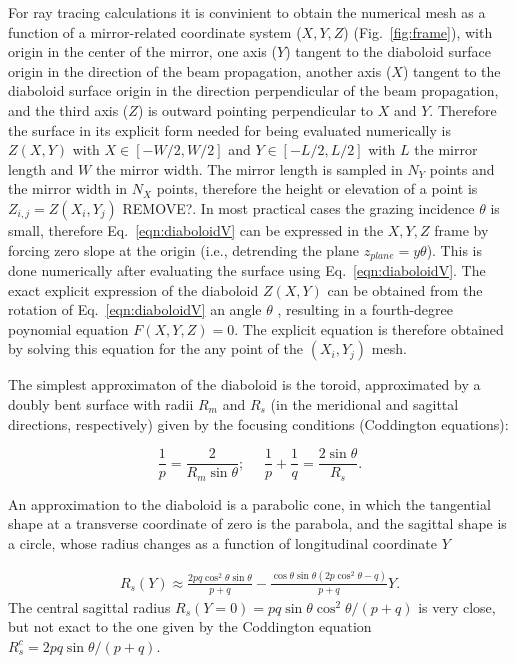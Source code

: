 \documentclass{iucr}              %
\newcommand{\inred}[1]{{\color{red}#1}}
\begin{document}
For ray tracing calculations it is convinient to obtain the numerical mesh as a function of a mirror-related coordinate system ($X,Y,Z$) (Fig.~\ref{fig:frame}), with origin in the center of the mirror, one axis ($Y$) tangent to the diaboloid surface origin in the direction of the beam propagation, another axis ($X$) tangent to the diaboloid surface origin in the direction perpendicular of the beam propagation, and the third axis ($Z$) is outward pointing perpendicular to $X$ and $Y$. \inred{Therefore the surface in its explicit form needed for being evaluated numerically is $Z(X,Y)$ with $X \in [-W/2, W/2]$ and $Y \in [-L/2, L/2]$ with $L$ the mirror length and $W$ the mirror width. The mirror length is sampled in $N_Y$ points and the mirror width in $N_X$ points, therefore the height or elevation of a point is $Z_{i,j}=Z(X_i,Y_j)$ REMOVE?.}
In most practical cases the grazing incidence $\theta$ is small, therefore Eq.~\ref{eqn:diaboloidV} can be expressed in the $X,Y,Z$ frame by forcing zero slope at the origin (i.e., detrending the plane $z_{plane}=y \theta$). This is done numerically after evaluating the surface using Eq.~\ref{eqn:diaboloidV}. 
The exact explicit expression of the diaboloid $Z(X,Y)$ can be obtained from the rotation of Eq.~\ref{eqn:diaboloidV} an angle $\theta$ \cite{part2}, resulting in a fourth-degree poynomial equation $F(X,Y,Z)=0$. The explicit equation is therefore obtained by solving this equation for the any point of the $(X_i,Y_j)$ mesh.

The simplest approximaton of the diaboloid is the toroid, approximated by a doubly bent surface with radii $R_m$ and $R_s$ (in the meridional and sagittal directions, respectively) given by the focusing conditions (Coddington equations):

\begin{equation}
\label{eqn:radii}
\frac{1}{p} = \frac{2 }{R_m \sin\theta };~~~~~~
\frac{1}{p} + \frac{1}{q} = \frac{2\sin\theta}{ R_s}.
\end{equation}

An approximation to the diaboloid is a parabolic cone, in which the tangential shape at a transverse coordinate of zero is the parabola, and the sagittal shape is a circle, whose radius changes as a function of longitudinal coordinate $Y$ \cite{part2}

\begin{multline}
\label{eq:sagRadius}
R_s(Y) 
\approx 
\frac{2p q \cos^2\theta \sin\theta  }{p + q} - 
\frac{\cos\theta \sin\theta (2 p \cos^2\theta - q)}{p + q} Y.
\end{multline}
The central sagittal radius $R_s(Y=0)=p q \sin\theta \cos^2\theta/ (p+q)$ is very close, but not exact to the one given by the Coddington equation $R_s^c=2 p q \sin\theta / (p+q)$.
\end{document}
